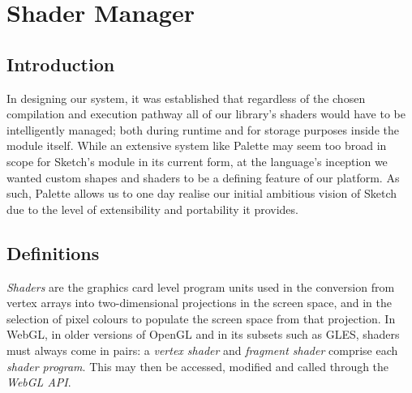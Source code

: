 \documentclass{l3proj}
\begin{document}
\section{Shader Manager}
\label{arch-shad}

\subsection{Introduction}
\label{arch-shad-intro}
In designing our system, it was established that regardless of the chosen compilation and execution pathway all of our library's shaders would have to be intelligently managed; both during runtime and for storage purposes inside the module itself. While an extensive system like Palette may seem too broad in scope for Sketch's module in its current form, at the language's inception we wanted custom shapes and shaders to be a defining feature of our platform. As such, Palette allows us to one day realise our initial ambitious vision of Sketch due to the level of extensibility and portability it provides.

\subsection{Definitions}
\label{arch-shad-def}
\textit{Shaders} are the graphics card level program units used in the conversion from vertex arrays into two-dimensional projections in the screen space, and in the selection of pixel colours to populate the screen space from that projection. In WebGL, in older versions of OpenGL and in its subsets such as GLES, shaders must always come in pairs: a \textit{vertex shader} and \textit{fragment shader} comprise each \textit{shader program}. This may then be accessed, modified and called through the \textit{WebGL API}.
\end{document}

